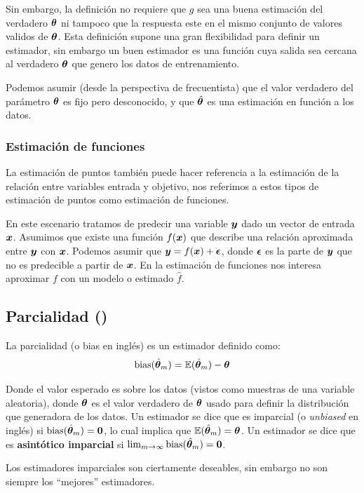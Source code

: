 Sin embargo, la definición no requiere que $g$ sea una buena estimación del verdadero ${\bm{\theta}}$ ni tampoco que la respuesta este en el mismo conjunto de valores validos de ${\bm{\theta}}$. Esta definición supone una gran flexibilidad para definir un estimador, sin embargo un buen estimador es una función cuya salida sea cercana al verdadero ${\bm{\theta}}$ que genero los datos de entrenamiento.

Podemos asumir (desde la perspectiva de frecuentista) que el valor verdadero del parámetro ${\bm{\theta}}$ es fijo pero desconocido, y que $\hat{{\bm{\theta}}}$ es una estimación en función a los datos.

\subsubsection{Estimación de funciones}
La estimación de puntos también puede hacer referencia a la estimación de la relación entre variables entrada y objetivo, nos referimos a estos tipos de estimación de puntos como estimación de funciones.

En este escenario tratamos de predecir una variable ${\bm{y}}$ dado un vector de entrada ${\bm{x}}$. Asumimos que existe una función $f({\bm{x}})$ que describe una relación aproximada entre ${\bm{y}}$ con ${\bm{x}}$. Podemos asumir que ${\bm{y}} = f({\bm{x}}) + {\bm{\epsilon}}$, donde ${\bm{\epsilon}}$ es la parte de ${\bm{y}}$ que no es predecible a partir de ${\bm{x}}$. En la estimación de funciones nos interesa aproximar $f$ con un modelo o estimado $\hat{f}$.

\subsection{Parcialidad ()}
La parcialidad (o \gls{bias} en inglés) es un estimador definido como:
\begin{equation}
  \mathrm{bias}(\hat{{\bm{\theta}}}_m) = \mathbb{E}(\hat{{\bm{\theta}}}_m) - {\bm{\theta}}
\end{equation}

Donde el valor esperado es sobre los datos (vistos como muestras de una variable aleatoria), donde ${\bm{\theta}}$ es el valor verdadero de ${\bm{\theta}}$ usado para definir la distribución que generadora de los datos. Un estimador se dice que es imparcial (o \textsl{unbiased} en inglés) si $\mathrm{bias}(\hat{{\bm{\theta}}}_m) = {\bm{0}}$, lo cual implica que $\mathbb{E}(\hat{{\bm{\theta}}}_m) = {\bm{\theta}}$. Un estimador se dice que es \textbf{asintótico imparcial} si $\lim_{m\to\infty}\mathrm{bias}(\hat{{\bm{\theta}}}_m) = {\bm{0}}$.

Los estimadores imparciales son ciertamente deseables, sin embargo no son siempre los ``mejores'' estimadores.

